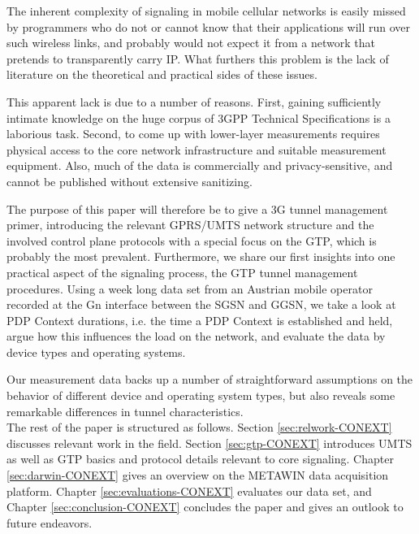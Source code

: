 The inherent complexity of signaling in mobile cellular networks is easily missed by programmers who do not or cannot know that their applications will run over such wireless links, and probably would not expect it from a network that pretends to transparently carry IP. What furthers this problem is the lack of literature on the theoretical and practical sides of these issues.

This apparent lack is due to a number of reasons. First, gaining sufficiently intimate knowledge on the huge corpus of \ac{3GPP} Technical Specifications %
is a laborious task. Second, to come up with lower-layer measurements requires physical access to the core network infrastructure and suitable measurement equipment. Also, much of the data is commercially and privacy-sensitive, and cannot be published without extensive sanitizing.

The purpose of this paper will therefore be to give a 3G tunnel management primer, introducing the relevant \acs{GPRS}/\acs{UMTS} network structure and the involved control plane protocols with a special focus on the \ac{GTP}, which is probably the most prevalent. %
Furthermore, we share our first insights into one practical aspect of the signaling process, the \ac{GTP} tunnel management procedures. Using a week long data set from an Austrian mobile operator recorded at the Gn interface between the \ac{SGSN} and \ac{GGSN}, %
we take a look at \ac{PDP} Context durations, i.e. the time a \ac{PDP} Context is established and held, argue how this influences the load on the network, and evaluate the data by device types and operating systems.

Our measurement data backs up a number of straightforward assumptions on the behavior of different device and operating system types, but also reveals some remarkable differences in tunnel characteristics.\\

The rest of the paper is structured as follows. Section \ref{sec:relwork-CONEXT} discusses relevant work in the field. Section \ref{sec:gtp-CONEXT} introduces \ac{UMTS} as well as \ac{GTP} basics and protocol details relevant to core signaling. Chapter \ref{sec:darwin-CONEXT} gives an overview on the \acs{METAWIN} data acquisition platform. Chapter \ref{sec:evaluations-CONEXT} evaluates our data set, and Chapter \ref{sec:conclusion-CONEXT} concludes the paper and gives an outlook to future endeavors.


